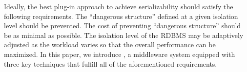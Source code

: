 Ideally, the best plug-in approach to achieve serializability should satisfy the following requirements.  The ``dangerous structure'' defined at a given isolation level should be prevented.  The cost of preventing ``dangerous structure'' should be as minimal as possible.
 The isolation level of the RDBMS may be adaptively adjusted as the workload varies so that the overall performance can be maximized.
In this paper, we introduce \sysname, a middleware system equipped with three key techniques that fulfill all of the aforementioned requirements.



